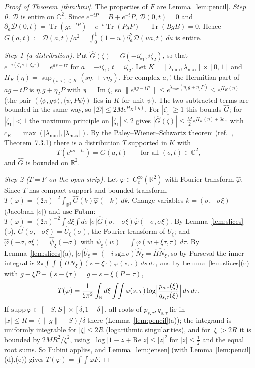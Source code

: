 \documentclass[11pt]{amsart}
\theoremstyle{definition}
\theoremstyle{remark}
\numberwithin{equation}{section}
\newcommand{\R}{\mathbb{R}}
\newcommand{\C}{\mathbb{C}}
\newcommand{\Tr}{\operatorname{Tr}}
\newcommand{\cD}{\mathcal{D}}
\renewcommand{\Re}{\operatorname{Re}}
\renewcommand{\Im}{\operatorname{Im}}
\begin{document}
\begin{proof}[Proof of Theorem~\ref{thm:bmv}]
The properties of $F$ are Lemma~\ref{lem:pencil}. \emph{Step 0.} $\cD$ is entire on $\C^2$. Since $e^{-tP}=B+e^{-t}P$,
$\cD(0,t)=0$ and $\partial_a\cD(0,t)=\Tr(ge^{-tP})-e^{-t}\Tr(PgP)-\Tr(BgB)=0$. Hence
$G(a,t):=\cD(a,t)/a^2=\int_0^1(1-u)\partial_a^2\cD(ua,t)\,du$ is entire.

\emph{Step 1 (a distribution).} Put $\hat G(\zeta)=G(-i\zeta_1,i\zeta_2)$, so that $e^{-i(\zeta_1s+\zeta_2\tau)}=
e^{as-t\tau}$ for $a=-i\zeta_1$, $t=i\zeta_2$. Let $K=[\lambda_{\min},\lambda_{\max}]\times[0,1]$ and
$H_K(\eta)=\sup_{(s,\tau)\in K}(s\eta_1+\tau\eta_2)$. For complex $a,t$ the Hermitian part of $ag-tP$ is
$\eta_1g+\eta_2P$ with $\eta=\Im\zeta$, so $\|e^{ag-tP}\|\le e^{\lambda_{\max}(\eta_1g+\eta_2P)}\le e^{H_K(\eta)}$
(the pair $(\langle\psi,g\psi\rangle,\langle\psi,P\psi\rangle)$ lies in $K$ for unit $\psi$). The two subtracted terms
are bounded in the same way, so $|\cD|\le2Me^{H_K(\eta)}$. For $|\zeta_1|\ge1$ this bounds $\hat G$; for $|\zeta_1|<1$
the maximum principle on $|\zeta_1|\le2$ gives $|\hat G(\zeta)|\le\frac M2e^{H_K(\eta)+3c_K}$ with
$c_K=\max(|\lambda_{\min}|,|\lambda_{\max}|)$. By the Paley--Wiener--Schwartz theorem (ref.~\cite{Hormander},
Theorem~7.3.1) there is a distribution $T$ supported in $K$ with
\begin{equation}\label{eq:T}
T(e^{as-t\tau})=G(a,t)\qquad\text{for all }(a,t)\in\C^2,
\end{equation}
and $\hat G$ is bounded on $\R^2$.

\emph{Step 2 ($T=F$ on the open strip).} Let $\varphi\in C_c^\infty(\R^2)$ with Fourier transform $\hat\varphi$. Since
$T$ has compact support and bounded transform, $T(\varphi)=(2\pi)^{-2}\int_{\R^2}\hat G(k)\hat\varphi(-k)\,dk$. Change
variables $k=(\sigma,-\sigma\xi)$ (Jacobian $|\sigma|$) and use Fubini:
$T(\varphi)=(2\pi)^{-2}\int d\xi\int d\sigma\,|\sigma|\hat G(\sigma,-\sigma\xi)\hat\varphi(-\sigma,\sigma\xi)$.
By Lemma~\ref{lem:slices}(b), $\hat G(\sigma,-\sigma\xi)=\hat U_\xi(\sigma)$, the Fourier transform of $U_\xi$; and
$\hat\varphi(-\sigma,\sigma\xi)=\hat\psi_\xi(-\sigma)$ with $\psi_\xi(w)=\int\varphi(w+\xi\tau,\tau)\,d\tau$. By
Lemma~\ref{lem:slices}(a), $|\sigma|\hat U_\xi=(-i\,\mathrm{sgn}\,\sigma)\hat N_\xi=\widehat{HN_\xi}$, so by Parseval
the inner integral is $2\pi\int\!\!\int(HN_\xi)(s-\xi\tau)\varphi(s,\tau)\,ds\,d\tau$, and by Lemma~\ref{lem:slices}(c)
with $g-\xi P-(s-\xi\tau)=g-s-\xi(P-\tau)$,
\[
T(\varphi)=\frac{1}{2\pi^2}\int_\R d\xi\int\!\!\int\varphi(s,\tau)\log\Bigl|\frac{p_{s,\tau}(\xi)}{q_{s,\tau}(\xi)}\Bigr|
\,ds\,d\tau .
\]
If $\mathrm{supp}\,\varphi\subset[-S,S]\times[\delta,1-\delta]$, all roots of $p_{s,\tau},q_{s,\tau}$ lie in
$|x|\le R=(\|g\|+S)/\delta$ there (Lemma~\ref{lem:pencil}(a)); the integrand is uniformly integrable for $|\xi|\le2R$
(logarithmic singularities), and for $|\xi|>2R$ it is bounded by $2MR^2/\xi^2$, using $|\log|1-z|+\Re z|\le|z|^2$ for
$|z|\le\frac12$ and the equal root sums. So Fubini applies, and Lemma~\ref{lem:jensen} (with
Lemma~\ref{lem:pencil}(d),(e)) gives $T(\varphi)=\int\!\!\int\varphi F$.


\end{proof}
\end{document}
